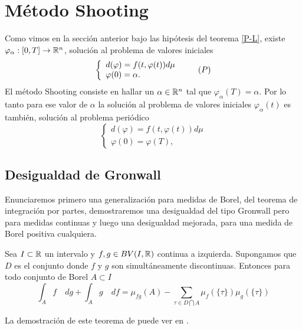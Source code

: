 \section{Método Shooting }
Como vimos en la sección anterior bajo las hipótesis del teorema \ref{P-L}, existe  $\varphi_\alpha:[0,T]\to \mathbb{R}^n$,  solución al problema de valores iniciales 
 \begin{equation}
	\left\lbrace \begin{array}{l}
		d(\varphi)=f(t,\varphi(t))d\mu\\
		\varphi(0)=\alpha.
	\end{array}\right. \tag{${P}$}
\end{equation}
El método Shooting consiste en hallar un $\alpha\in\mathbb{R}^n$ tal que $\varphi_\alpha(T)=\alpha$.  
Por lo tanto para ese valor de $\alpha$ la solución al problema de valores iniciales  $\varphi_\alpha(t)$ es también, solución al problema periódico 
 \begin{equation*}
	\left\lbrace \begin{array}{l}
		d(\varphi)=f(t,\varphi(t))d\mu\\
		\varphi(0)=\varphi(T),
	\end{array}\right. 
\end{equation*}



\subsection{Desigualdad de Gronwall}
Enunciaremos primero una generalización para medidas de Borel, del teorema de integración por partes, demostraremos una desigualdad del tipo Gronwall pero para medidas continuas y luego una desigualdad mejorada, para una medida de Borel positiva cualquiera.


\begin{thm}\label{T Partes}
	Sea $I\subset\mathbb{R}$ un intervalo y $f,g\in BV(I,\mathbb{R})$ continua a izquierda. Supongamos que $D$ es el conjunto donde $f$ y $g$ son simultáneamente  discontinuas. Entonces para todo conjunto de Borel $A\subset I$
	\begin{equation}\label{eq:Partes}
		\int_A f \quad dg+\int_Ag \quad df =\mu_{fg}(A)-\sum_{\tau\in D\bigcap A}\mu_{f}(\{\tau\})\mu_{g}(\{\tau\})
	\end{equation}
\end{thm}
La demostración de este teorema de puede ver en \cite[Teorema 6.2.2]{Carter}.


